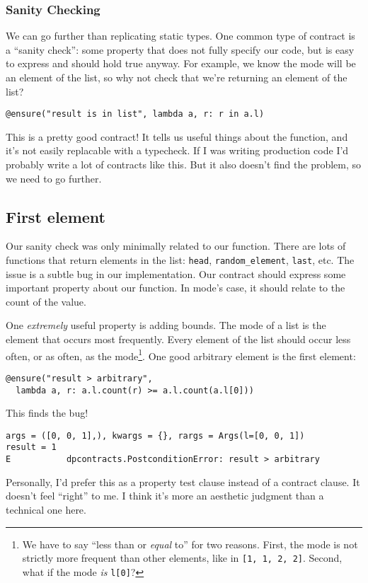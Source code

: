 \subsubsection{Sanity Checking}
\label{sanity-checking}

We can go further than replicating static types. One common type of
contract is a ``sanity check'': some property that does not fully
specify our code, but is easy to express and should hold true anyway.
For example, we know the mode will be an element of the list, so why not
check that we're returning an element of the list?

\begin{verbatim}
@ensure("result is in list", lambda a, r: r in a.l)
\end{verbatim}
This is a pretty good contract! It tells us useful things about the
function, and it's not easily replacable with a typecheck. If I was
writing production code I'd probably write a lot of contracts like this.
But it also doesn't find the problem, so we need to go further.

\subsection{First element}
\label{first-element}

Our sanity check was only minimally related to our function. There are
lots of functions that return elements in the list: \texttt{head},
\texttt{random\_element}, \texttt{last}, etc. The issue is a subtle bug
in our implementation. Our contract should express some important
property about our function. In mode's case, it should relate to the
count of the value.

One \emph{extremely} useful property is adding bounds. The mode of a
list is the element that occurs most frequently. Every element of the
list should occur less often, or as often, as the
mode\footnote{We have to say ``less than or \textit{equal} to'' for two reasons. First, the mode is not strictly more frequent than other elements, like in \texttt{[1, 1, 2, 2]}. Second, what if the mode \textit{is} \texttt{l[0]}?}.
One good arbitrary element is the first element:

\begin{verbatim}
@ensure("result > arbitrary", 
  lambda a, r: a.l.count(r) >= a.l.count(a.l[0]))
\end{verbatim}
This finds the bug!

\begin{verbatim}
args = ([0, 0, 1],), kwargs = {}, rargs = Args(l=[0, 0, 1])
result = 1
E           dpcontracts.PostconditionError: result > arbitrary
\end{verbatim}
Personally, I'd prefer this as a property test clause instead of a
contract clause. It doesn't feel ``right'' to me. I think it's more an
aesthetic judgment than a technical one here.

